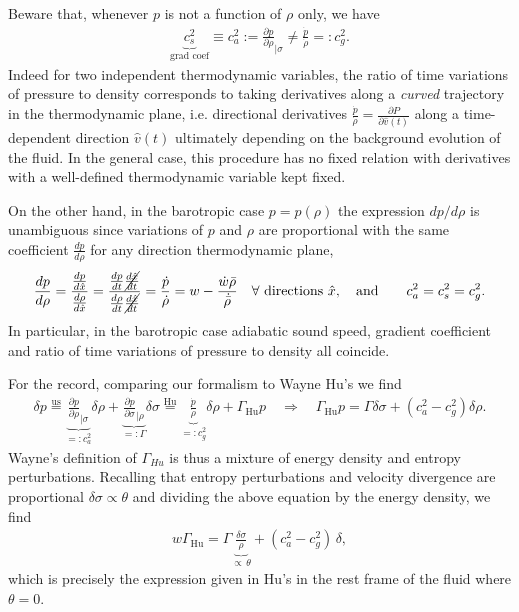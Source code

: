 Beware that, whenever $p$ is not a function of $\rho$ only, we have
\begin{align}
    \underbrace{c_s^2}_{\text{grad coef}}\equiv c_a^2:=\frac{\partial p}{\partial \rho}_{|\sigma}\neq \frac{\dot{p}}{\dot{\rho}}=:c_g^2.
\end{align}
Indeed for two independent thermodynamic variables, the ratio of time variations of pressure to density corresponds to taking derivatives along a \emph{curved} trajectory in the thermodynamic plane, i.e. directional derivatives $\tfrac{\dot{p}}{\dot{\rho}}=\tfrac{\partial P}{\partial \hat{v}(t)}$ along a time-dependent direction $\hat{v}(t)$ ultimately depending on the background evolution of the fluid.
In the general case, this procedure has no fixed relation with derivatives with a well-defined thermodynamic variable kept fixed.

On the other hand, in the barotropic case $p=p(\rho)$ the expression $dp/d\rho$ is unambiguous since variations of $p$ and $\rho$ are proportional with the same coefficient $\tfrac{dp}{d\rho}$ for any direction  thermodynamic plane,
\begin{align}\label{eq:barotropic_speed_of_sound}
    \frac{dp}{d\rho}=\frac{\tfrac{dp}{d\hat{x}}}{\tfrac{d\rho}{d\hat{x}}}=\frac{\tfrac{dp}{dt}\cancel{\tfrac{d\hat{x}}{dt}}}{\tfrac{d\rho}{dt}\cancel{\tfrac{d\hat{x}}{dt}}}= \frac{\dot{p}}{\dot{\rho}}=w-\frac{\dot{w}\bar{\rho}}{\dot{\bar{\rho}}}\quad \forall  \text{ directions } \hat{x}, \quad \text{and}\qquad c_a^2=c_s^2=c_g^2.
\end{align}
In particular, in the barotropic case adiabatic sound speed, gradient coefficient and ratio of time variations of pressure to density all coincide.

For the record, comparing our formalism to Wayne Hu's \cite[equation (3)]{Hu:1998kj} we find
\begin{align}
    \delta p\overset{\text{us}}{=} \underbrace{\tfrac{\partial p}{\partial \rho}_{|\sigma}}_{=:c_a^2}\delta\rho + \underbrace{\tfrac{\partial p}{\partial \sigma}_{|\rho}}_{=:\Gamma}\delta\sigma \overset{\text{Hu}}{=} \underbrace{\tfrac{\dot{p}}{\dot{\rho}}}_{=:c_g^2} \delta \rho + \Gamma_{\text{Hu}} p
    \quad\Rightarrow\quad \Gamma_{\text{Hu}} p = \Gamma \delta\sigma + (c_a^2-c_g^2)\delta\rho.
\end{align}
Wayne's definition of $\Gamma_{Hu}$ is thus a mixture of energy density and entropy perturbations.
Recalling that entropy perturbations and velocity divergence are proportional $\delta\sigma \propto \theta$ and dividing the above equation by the energy density, we find
\begin{align}
    w\Gamma_{\text{Hu}} = \Gamma \underbrace{\tfrac{\delta\sigma}{\rho}}_{\propto\, \theta}+ (c_a^2-c_g^2)\,\delta,
\end{align}
which is precisely the expression given in Hu's \cite[equation (3)]{Hu:1998kj} in the rest frame of the fluid where $\theta=0$.

